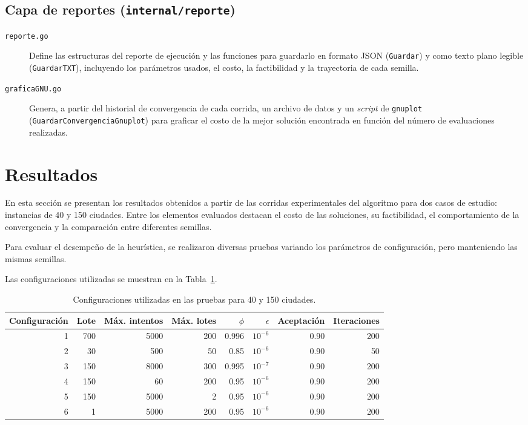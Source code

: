 \documentclass[12pt,a4paper]{article}
\begin{document}
\subsection{Capa de reportes (\texttt{internal/reporte})}

\begin{description}
  \item[\texttt{reporte.go}] Define las estructuras del reporte de ejecución y las funciones para guardarlo en formato JSON (\texttt{Guardar}) y como texto plano legible (\texttt{GuardarTXT}), incluyendo los parámetros usados, el costo, la factibilidad y la trayectoria de cada semilla.
  \item[\texttt{graficaGNU.go}] Genera, a partir del historial de convergencia de cada corrida, un archivo de datos y un \textit{script} de \texttt{gnuplot} (\texttt{GuardarConvergenciaGnuplot}) para graficar el costo de la mejor solución encontrada en función del número de evaluaciones realizadas.
\end{description}

\section{Resultados}
En esta sección se presentan los resultados obtenidos a partir de las corridas experimentales del algoritmo para dos casos de estudio: instancias de 40 y 150 ciudades. Entre los elementos evaluados destacan el costo de las soluciones, su factibilidad, el comportamiento de la convergencia y la comparación entre diferentes semillas.

Para evaluar el desempeño de la heurística, se realizaron diversas pruebas variando los parámetros de configuración, pero manteniendo las mismas semillas.

Las configuraciones utilizadas se muestran en la Tabla~\ref{tab:parametros}.

\begin{table}[H]
    \centering
    \caption{Configuraciones utilizadas en las pruebas para 40 y 150 ciudades.}
    \label{tab:parametros}
    \begin{tabular}{rrrrrrrr}
        \toprule
       Configuración & Lote & Máx. intentos & Máx. lotes & $\phi$ &
        $\epsilon$ & Aceptación & Iteraciones \\
        \midrule
      1 & 700 & 5000 & 200 & 0.996 & $10^{-6}$ & 0.90 & 200 \\
      2 & 30  & 500  & 50  & 0.85  & $10^{-6}$ & 0.90 & 50  \\
      3 & 150 & 8000 & 300 & 0.995 & $10^{-7}$ & 0.90 & 200 \\
      4 & 150 & 60   & 200 & 0.95  & $10^{-6}$ & 0.90 & 200 \\
      5 & 150 & 5000 & 2   & 0.95  & $10^{-6}$ & 0.90 & 200 \\
      6 & 1   & 5000 & 200 & 0.95  & $10^{-6}$ & 0.90 & 200 \\
        \bottomrule
    \end{tabular}
\end{table}
\end{document}

